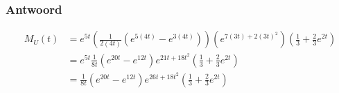 \documentclass[main.tex]{subfiles}
\begin{document}
\subsubsection*{Antwoord}
\begin{align}
  M_{U}(t)
  &= e^{5t}\left(\frac{1}{2(4t)}(e^{5(4t)}-e^{3(4t)})\right)\left(e^{7(3t) + 2(3t)^{2}}\right)\left(\frac{1}{3} + \frac{2}{3}e^{2t}\right)\\
  &= e^{5t}\frac{1}{8t}(e^{20t}-e^{12t})e^{21t + 18t^{2}}\left(\frac{1}{3} + \frac{2}{3}e^{2t}\right)\\
  &= \frac{1}{8t}(e^{20t}-e^{12t})e^{26t + 18t^{2}}\left(\frac{1}{3} + \frac{2}{3}e^{2t}\right)
\end{align}


\iffalse
\newpage
\section{algoritme}
\subsection*{Abstract}
\subsubsection*{Vraag}
\subsubsection*{Antwoord}
\subsection*{Voorbeeld}
\subsubsection*{Vraag}
\subsubsection*{Antwoord}
\fi
\end{document}
